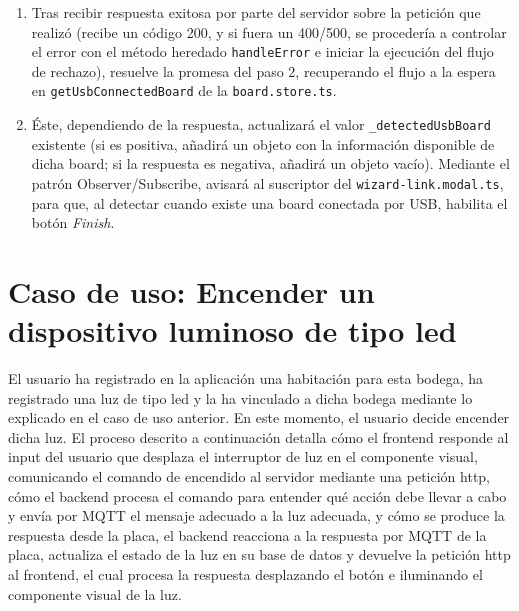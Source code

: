 \begin{enumerate}
\item  Tras recibir respuesta exitosa por parte del servidor sobre la petición que realizó (recibe un código 200, y si fuera un 400/500, se procedería a controlar el error con el método heredado \verb|handleError| e iniciar la ejecución del flujo de rechazo), resuelve la promesa del paso 2, recuperando el flujo a la espera en \verb|getUsbConnectedBoard| de la \verb|board.store.ts|.

\item  Éste, dependiendo de la respuesta, actualizará el valor \verb|_detectedUsbBoard| existente (si es positiva, añadirá un objeto con la información disponible de dicha board; si la respuesta es negativa, añadirá un objeto vacío). Mediante el patrón Observer/Subscribe, avisará al suscriptor del \verb|wizard-link.modal.ts|, para que, al detectar cuando existe una board conectada por USB, habilita el botón \textit{Finish}.
\end{enumerate}

\section{Caso de uso: Encender un dispositivo luminoso de tipo led}
\label{ch:Capitulo5.3}
El usuario ha registrado en la aplicación una habitación para esta bodega, ha registrado una luz de tipo led y la ha vinculado a dicha bodega mediante lo explicado en el caso de uso anterior. En este momento, el usuario decide encender dicha luz. El proceso descrito a continuación detalla cómo el frontend responde al input del usuario que desplaza el interruptor de luz en el componente visual, comunicando el comando de encendido al servidor mediante una petición http, cómo el backend procesa el comando para entender qué acción debe llevar a cabo y envía por MQTT el mensaje adecuado a la luz adecuada, y cómo se produce la respuesta desde la placa, el backend reacciona a la respuesta por MQTT de la placa, actualiza el estado de la luz en su base de datos y devuelve la petición http al frontend, el cual procesa la respuesta desplazando el botón e iluminando el componente visual de la luz.

